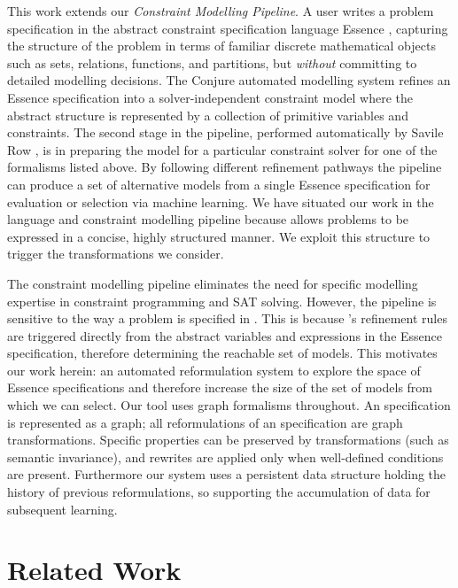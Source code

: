 \documentclass[runningheads]{llncs}
\begin{document}
This work extends our {\em Constraint Modelling Pipeline}. A user writes a problem specification in the abstract constraint specification language {\sc Essence} \cite{frisch2008:essence}, capturing the structure of the problem in terms of familiar discrete mathematical objects such as sets, relations, functions, and partitions, but {\em without} committing to detailed modelling decisions. The {\sc Conjure} \cite{akgun2022conjure} automated modelling system refines an {\sc Essence} specification into a solver-independent constraint model where the abstract structure is represented by a collection of primitive variables and constraints. The second stage in the pipeline, performed automatically by {\sc Savile Row} \cite{savilerow}, is in preparing the model for a particular constraint solver for one of the formalisms listed above. By following different refinement pathways the pipeline can produce a set of alternative models from a single {\sc Essence} specification for evaluation or selection via machine learning. We have situated our work in the \essence language and constraint modelling pipeline because \essence allows problems to be expressed in a concise, highly structured manner. We exploit this structure to trigger the transformations we consider. 

The constraint modelling pipeline eliminates the need for specific modelling expertise in constraint programming and SAT solving.
However, the pipeline is sensitive to the way a problem is specified in \essence. This is because \conjure's refinement rules are triggered directly from the abstract variables and expressions in the {\sc Essence} specification, therefore determining the reachable set of models.
This motivates our work herein: an automated reformulation system to explore the space of {\sc Essence} specifications and therefore increase the size of the set of models from which we can select. Our tool uses graph formalisms throughout. An \essence specification is represented as a graph; all reformulations of an \essence specification are graph transformations. Specific properties can be preserved by transformations (such as semantic invariance), and rewrites are applied only when well-defined conditions are present. Furthermore our system uses a persistent data structure holding the history of previous reformulations, so supporting the accumulation of data for subsequent learning.

\section{Related Work}
\end{document}
